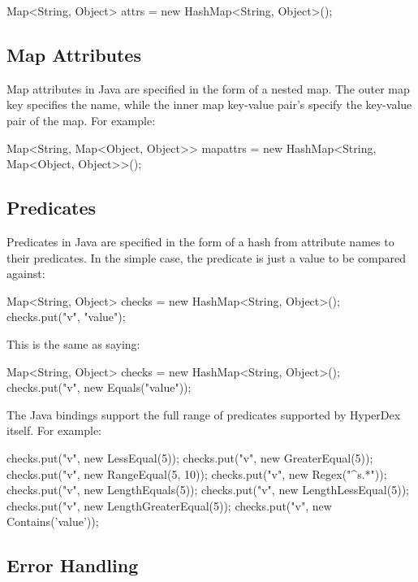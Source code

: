 \begin{javacode}
Map<String, Object> attrs = new HashMap<String, Object>();
\end{javacode}

\subsection{Map Attributes}
\label{sec:api:java:map-attributes}

Map attributes in Java are specified in the form of a nested map.  The outer
map key specifies the name, while the inner map key-value pair's specify the
key-value pair of the map.  For example:

\begin{javacode}
Map<String, Map<Object, Object>> mapattrs = new HashMap<String, Map<Object, Object>>();
\end{javacode}

\subsection{Predicates}
\label{sec:api:java:predicates}

Predicates in Java are specified in the form of a hash from attribute names to
their predicates.  In the simple case, the predicate is just a value to be
compared against:

\begin{javacode}
Map<String, Object> checks = new HashMap<String, Object>();
checks.put("v", "value");
\end{javacode}

This is the same as saying:

\begin{javacode}
Map<String, Object> checks = new HashMap<String, Object>();
checks.put("v", new Equals("value"));
\end{javacode}

The Java bindings support the full range of predicates supported by HyperDex
itself.  For example:

\begin{javacode}
checks.put("v", new LessEqual(5));
checks.put("v", new GreaterEqual(5));
checks.put("v", new RangeEqual(5, 10));
checks.put("v", new Regex("^s.*"));
checks.put("v", new LengthEquals(5));
checks.put("v", new LengthLessEqual(5));
checks.put("v", new LengthGreaterEqual(5));
checks.put("v", new Contains('value'));
\end{javacode}

\subsection{Error Handling}
\label{sec:api:java:error-handling}

